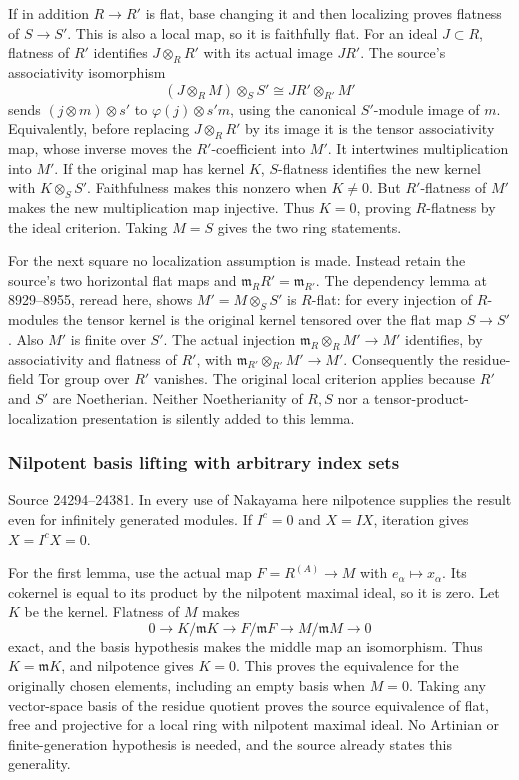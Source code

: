 If in addition \(R\to R'\) is flat, base changing it and then localizing proves flatness of \(S\to S'\). This is also a local map, so it is faithfully flat. For an ideal \(J\subset R\), flatness of \(R'\) identifies \(J\otimes_RR'\) with its actual image \(JR'\). The source's associativity isomorphism \[
(J\otimes_RM)\otimes_SS'\cong JR'\otimes_{R'}M'
\] sends \((j\otimes m)\otimes s'\) to \(\varphi(j)\otimes s'm\), using the canonical \(S'\)-module image of \(m\). Equivalently, before replacing \(J\otimes_RR'\) by its image it is the tensor associativity map, whose inverse moves the \(R'\)-coefficient into \(M'\). It intertwines multiplication into \(M'\). If the original map has kernel \(K\), \(S\)-flatness identifies the new kernel with \(K\otimes_SS'\). Faithfulness makes this nonzero when \(K\ne0\). But \(R'\)-flatness of \(M'\) makes the new multiplication map injective. Thus \(K=0\), proving \(R\)-flatness by the ideal criterion. Taking \(M=S\) gives the two ring statements.

For the next square no localization assumption is made. Instead retain the source's two horizontal flat maps and \(\mathfrak m_RR'=\mathfrak m_{R'}\). The dependency lemma at 8929--8955, reread here, shows \(M'=M\otimes_SS'\) is \(R\)-flat: for every injection of \(R\)-modules the tensor kernel is the original kernel tensored over the flat map \(S\to S'\). Also \(M'\) is finite over \(S'\). The actual injection \(\mathfrak m_R\otimes_RM'\to M'\) identifies, by associativity and flatness of \(R'\), with \(\mathfrak m_{R'}\otimes_{R'}M'\to M'\). Consequently the residue-field Tor group over \(R'\) vanishes. The original local criterion applies because \(R'\) and \(S'\) are Noetherian. Neither Noetherianity of \(R,S\) nor a tensor-product-localization presentation is silently added to this lemma.

\subsubsection{Nilpotent basis lifting with arbitrary index sets}\label{algebra-proof-017-nilpotent-basis-lifting-with-arbitrary-index-sets}

Source 24294--24381. In every use of Nakayama here nilpotence supplies the result even for infinitely generated modules. If \(I^c=0\) and \(X=IX\), iteration gives \(X=I^cX=0\).

For the first lemma, use the actual map \(F=R^{(A)}\to M\) with \(e_\alpha\mapsto x_\alpha\). Its cokernel is equal to its product by the nilpotent maximal ideal, so it is zero. Let \(K\) be the kernel. Flatness of \(M\) makes \[
0\to K/\mathfrak mK\to F/\mathfrak mF\to M/\mathfrak mM\to0
\] exact, and the basis hypothesis makes the middle map an isomorphism. Thus \(K=\mathfrak mK\), and nilpotence gives \(K=0\). This proves the equivalence for the originally chosen elements, including an empty basis when \(M=0\). Taking any vector-space basis of the residue quotient proves the source equivalence of flat, free and projective for a local ring with nilpotent maximal ideal. No Artinian or finite-generation hypothesis is needed, and the source already states this generality.

